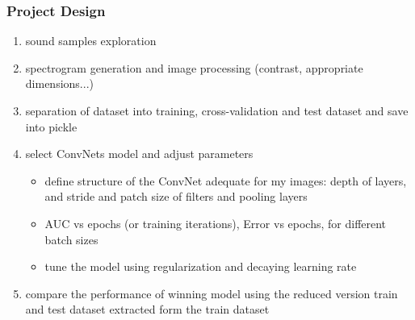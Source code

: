 \documentclass[]{article}
\begin{document}
\pagebreak
\subsubsection{Project Design}\label{project-design}

\begin{enumerate}
	\item sound samples exploration
	\item spectrogram generation and image processing (contrast, appropriate dimensions...)
	\item separation of dataset into training, cross-validation and test dataset and save into pickle 
	\item select ConvNets model and adjust parameters
	\begin{itemize}
		\item define structure of the ConvNet adequate for my images: depth of layers, and stride and patch size of filters and pooling layers
		\item AUC vs epochs (or training iterations), Error vs epochs, for different batch sizes
		\item tune the model using regularization and decaying learning rate		
	\end{itemize}
	\item compare the performance of winning model using the reduced version train and test dataset extracted form the train dataset
\end{enumerate}
\end{document}

